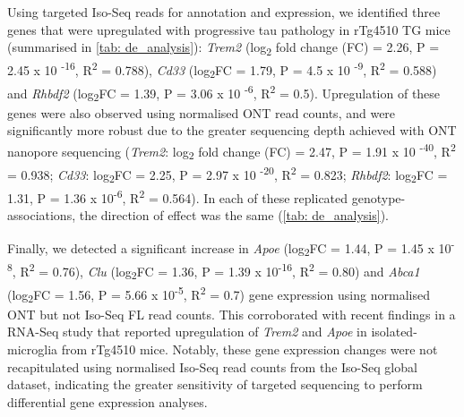 Using targeted Iso-Seq reads for annotation and expression, we identified three genes that were upregulated with progressive tau pathology in rTg4510 TG mice (summarised in \cref{tab: de_analysis}): \textit{Trem2} (log\textsubscript{2} fold change (FC) = 2.26, P = 2.45 x 10 \textsuperscript{-16}, R\textsuperscript{2} = 0.788), \textit{Cd33} (log\textsubscript{2}FC = 1.79, P = 4.5 x 10 \textsuperscript{-9}, R\textsuperscript{2} = 0.588) and \textit{Rhbdf2} (log\textsubscript{2}FC = 1.39, P = 3.06 x 10 \textsuperscript{-6}, R\textsuperscript{2} = 0.5). Upregulation of these genes were also observed using normalised ONT read counts, and were significantly more robust due to the greater sequencing depth achieved with ONT nanopore sequencing (\textit{Trem2}: log\textsubscript{2} fold change (FC) = 2.47, P = 1.91 x 10 \textsuperscript{-40}, R\textsuperscript{2} = 0.938; \textit{Cd33}: log\textsubscript{2}FC = 2.25, P = 2.97 x 10 \textsuperscript{-20}, R\textsuperscript{2} = 0.823; \textit{Rhbdf2}: log\textsubscript{2}FC = 1.31, P = 1.36 x 10\textsuperscript{-6}, R\textsuperscript{2} = 0.564). In each of these replicated genotype-associations, the direction of effect was the same (\cref{tab: de_analysis}). 

Finally, we detected a significant increase in \textit{Apoe} (log\textsubscript{2}FC = 1.44, P = 1.45 x 10\textsuperscript{-8},  R\textsuperscript{2} = 0.76), \textit{Clu} (log\textsubscript{2}FC = 1.36, P = 1.39 x 10\textsuperscript{-16}, R\textsuperscript{2} = 0.80) and \textit{Abca1} (log\textsubscript{2}FC = 1.56, P = 5.66 x 10\textsuperscript{-5}, R\textsuperscript{2} = 0.7) gene expression using normalised ONT but not Iso-Seq FL read counts. This corroborated with recent findings in a RNA-Seq study that reported upregulation of \textit{Trem2} and \textit{Apoe} in isolated-microglia from rTg4510 mice\cite{Sobue2021}. Notably, these gene expression changes were not recapitulated using normalised Iso-Seq read counts from the Iso-Seq global dataset, indicating the greater sensitivity of targeted sequencing to perform differential gene expression analyses. 

